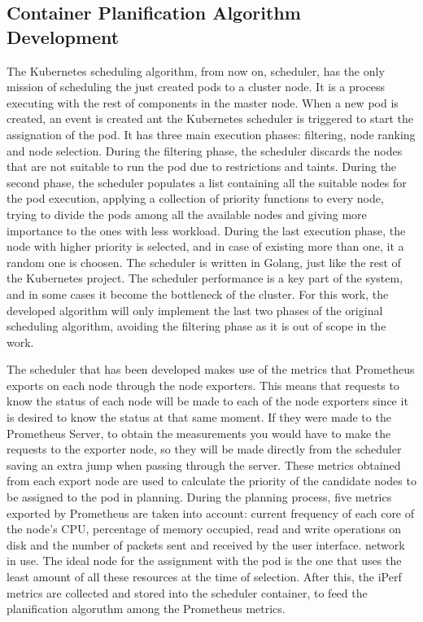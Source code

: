 \documentclass[conference]{IEEEtran}
\begin{document}
\subsection{Container Planification Algorithm Development}
The Kubernetes scheduling algorithm, from now on, scheduler, has the only mission of scheduling
the just created pods to a cluster node. It is a process executing with the rest of components
in the master node. When a new pod is created, an event is created ant the Kubernetes scheduler is 
triggered to start the assignation of the pod. It has three main execution phases: filtering,
node ranking and node selection. During the filtering phase, the scheduler discards the nodes
that are not suitable to run the pod due to restrictions and taints. During the second phase, 
the scheduler populates a list containing all the suitable nodes for the pod execution, applying
a collection of priority functions to every node, trying to divide the pods among all the
available nodes and giving more importance to the ones with less workload. During the last execution
phase, the node with higher priority is selected, and in case of existing more than one, it a random 
one is choosen. 
The scheduler is written in Golang, just like the rest of the Kubernetes project. The scheduler
performance is a key part of the system, and in some cases it become the bottleneck of the cluster.
For this work, the developed algorithm will only implement the last two phases of the original
scheduling algorithm, avoiding the filtering phase as it is out of scope in the work.

The scheduler that has been developed makes use of the metrics that Prometheus exports on each node through the node exporters.
This means that requests to know the status of each node will be made to each of the node exporters since it is desired to know
the status at that same moment. If they were made to the Prometheus Server, to obtain the measurements you would have to make the 
requests to the exporter node, so they will be made directly from the scheduler saving an extra jump when passing through the server.
These metrics obtained from each export node are used to calculate the priority of the candidate nodes to be assigned to the pod
in planning. During the planning process, five metrics exported by Prometheus are taken into account: current frequency of each core
of the node's CPU, percentage of memory occupied, read and write operations on disk and the number of packets sent and received by the
user interface. network in use. The ideal node for the assignment with the pod is the one that uses the least amount of all these
resources at the time of selection. After this, the iPerf metrics are collected and stored into the scheduler container, to feed
the planification algoruthm among the Prometheus metrics.
\end{document}
